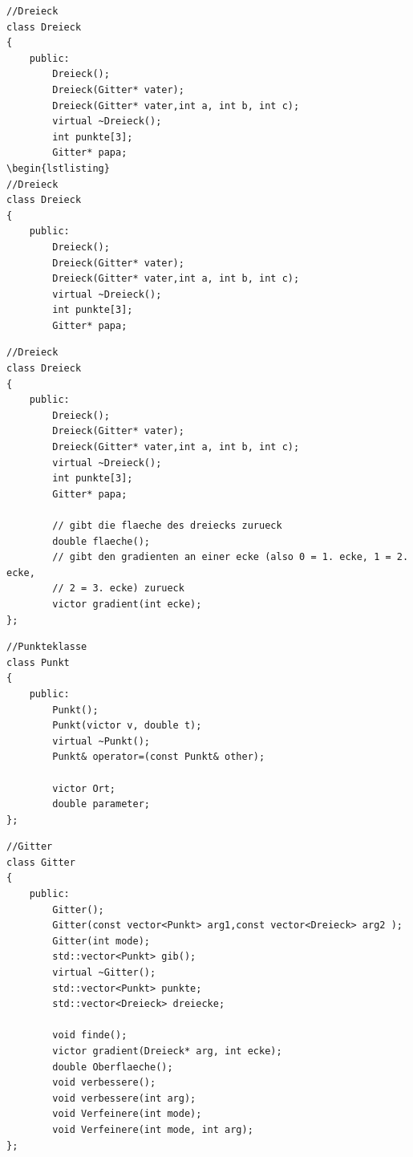 \documentclass{beamer}
\begin{document}
\begin{frame}[fragile]
\begin{lstlisting}
//Dreieck
class Dreieck
{
    public:
		Dreieck();
        Dreieck(Gitter* vater);
        Dreieck(Gitter* vater,int a, int b, int c);
        virtual ~Dreieck();
        int punkte[3];
        Gitter* papa;
\begin{lstlisting}
//Dreieck
class Dreieck
{
    public:
		Dreieck();
        Dreieck(Gitter* vater);
        Dreieck(Gitter* vater,int a, int b, int c);
        virtual ~Dreieck();
        int punkte[3];
        Gitter* papa;
\end{lstlisting}
\end{frame}

\begin{frame}[fragile]
\begin{lstlisting}
//Dreieck
class Dreieck
{
    public:
		Dreieck();
        Dreieck(Gitter* vater);
        Dreieck(Gitter* vater,int a, int b, int c);
        virtual ~Dreieck();
        int punkte[3];
        Gitter* papa;

        // gibt die flaeche des dreiecks zurueck
        double flaeche();
        // gibt den gradienten an einer ecke (also 0 = 1. ecke, 1 = 2. ecke,
        // 2 = 3. ecke) zurueck
        victor gradient(int ecke);
};
\end{lstlisting}
\end{frame}

\begin{frame}[fragile]
\begin{lstlisting}
//Punkteklasse
class Punkt
{
    public:
        Punkt();
        Punkt(victor v, double t);
        virtual ~Punkt();
        Punkt& operator=(const Punkt& other);

        victor Ort;
        double parameter;
};
\end{lstlisting}
\end{frame}

\begin{frame}[fragile]
\begin{lstlisting}
//Gitter
class Gitter
{
    public:
        Gitter();
        Gitter(const vector<Punkt> arg1,const vector<Dreieck> arg2 );
        Gitter(int mode);
        std::vector<Punkt> gib();
        virtual ~Gitter();
        std::vector<Punkt> punkte;
        std::vector<Dreieck> dreiecke;

        void finde();
        victor gradient(Dreieck* arg, int ecke);
        double Oberflaeche();
        void verbessere();
        void verbessere(int arg);
        void Verfeinere(int mode);
        void Verfeinere(int mode, int arg);
};
\end{lstlisting}
\end{frame}
\end{document}
